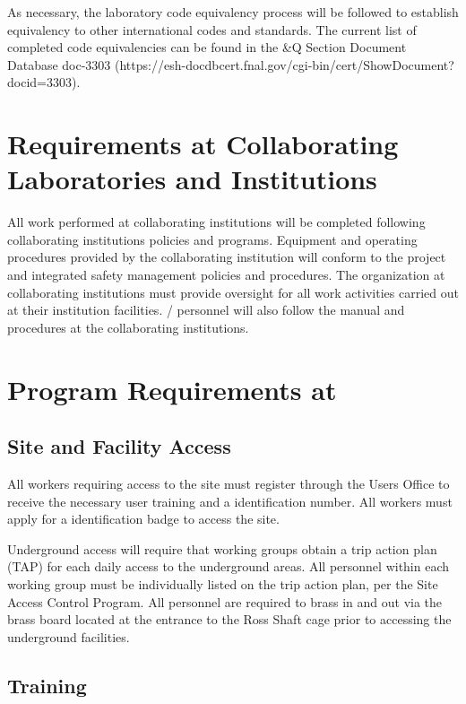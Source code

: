 As necessary, the laboratory code equivalency process will be followed
to establish equivalency to other international codes and
standards. The current list of completed code equivalencies can be
found in the \&Q Section Document Database doc-3303
(https://esh-docdbcert.fnal.gov/cgi-bin/cert/ShowDocument?docid=3303).


\section{ Requirements at Collaborating Laboratories and Institutions}

All work performed at collaborating institutions will be completed
following collaborating institutions  policies and
programs. Equipment and operating procedures provided by the
collaborating institution will conform to the  project
 and integrated safety management policies and
procedures. The  organization at collaborating institutions
must provide  oversight for all work activities carried
out at their institution facilities. /
personnel will also follow the  manual and procedures at
the collaborating institutions.

\section{  Program Requirements at \surf}

\subsection{Site and Facility Access}

All  workers requiring access to the \surf site must
register through the \fnal Users Office to receive the necessary user
training and a \fnal identification number. All workers must apply for
a \surf identification badge to access the \surf site.

\surf Underground access will require that working groups obtain a trip
action plan (TAP) for each daily access to the underground areas.  All
personnel within each working group must be individually listed on the
trip action plan, per the \surf Site Access Control Program. All
personnel are required to brass in and out via the brass board
located at the entrance to the Ross Shaft cage prior to accessing the
underground facilities.

\subsection{ Training}

